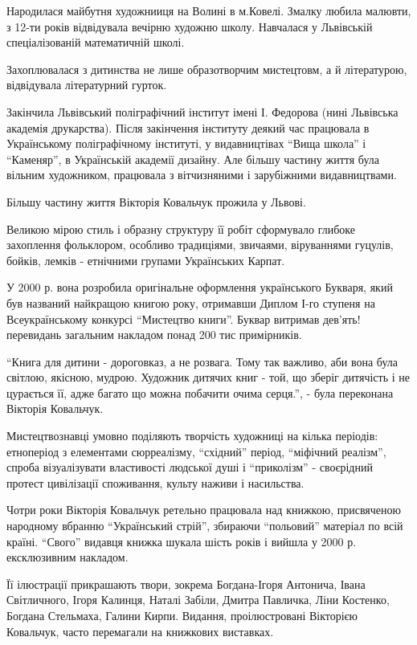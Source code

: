 Народилася майбутня художнииця на Волині в м.Ковелі. Змалку любила малювти, з
12-ти років відвідувала вечірню художню школу. Навчалася у Львівській
спеціалізованій математичній школі. 

Захоплювалася з дитинства не лише образотворчим мистецтовм, а й літературою,
відвідувала літературний гурток.

Закінчила Львівський поліграфічний інститут імені І. Федорова (нині Львівська
академія друкарства). Після закінчення інституту деякий час працювала в
Українському поліграфічному інституті, у видавництівах \enquote{Вища школа} і
\enquote{Каменяр}, в Українській академії дизайну. Але більшу частину життя була
вільним художником, працювала з вітчизняними і зарубіжними видавництвами. 

Більшу частину життя Вікторія Ковальчук прожила у Львові.

Великою мірою стиль і образну структуру її робіт сформувало глибоке захоплення
фольклором, особливо традиціями, звичаями, віруваннями гуцулів, бойків, лемків
- етнічними групами Українських Карпат.

У 2000 р. вона розробила оригінальне оформлення українського Букваря, який був
названий найкращою книгою року, отримавши Диплом І-го ступеня на
Всеукраїнському конкурсі \enquote{Мистецтво книги}. Буквар витримав дев'ять! перевидань
загальним накладом понад 200 тис примірників. 

\enquote{Книга для дитини - дороговказ, а не розвага. Тому так важливо, аби вона була
світлою, якісною, мудрою. Художник дитячих книг - той, що зберіг дитячість і не
цурається її, адже багато що можна побачити очима серця.}, - була переконана
Вікторія Ковальчук. 

Мистецтвознавці умовно поділяють творчість художниці на кілька періодів:
етноперіод з елементами сюрреалізму, \enquote{східний} період, \enquote{міфічний реалізм},
спроба візуалізувати властивості людської душі і \enquote{приколізм} - своєрідний
протест цивілізації споживання, культу наживи і насильства.

Чотри роки Вікторія Ковальчук ретельно працювала над книжкою, присвяченою
народному вбранню \enquote{Український стрій}, збираючи \enquote{польовий} матеріал по всій
країні. \enquote{Свого} видавця книжка шукала шість років і вийшла у 2000 р.
ексклюзивним накладом.

Її ілюстрації прикрашають твори, зокрема Богдана-Ігоря Антонича, Івана
Світличного, Ігоря Калинця, Наталі Забіли, Дмитра Павличка, Ліни Костенко,
Богдана Стельмаха,  Галини Кирпи. Видання, проілюстровані Вікторією Ковальчук,
часто перемагали на книжкових виставках. 

